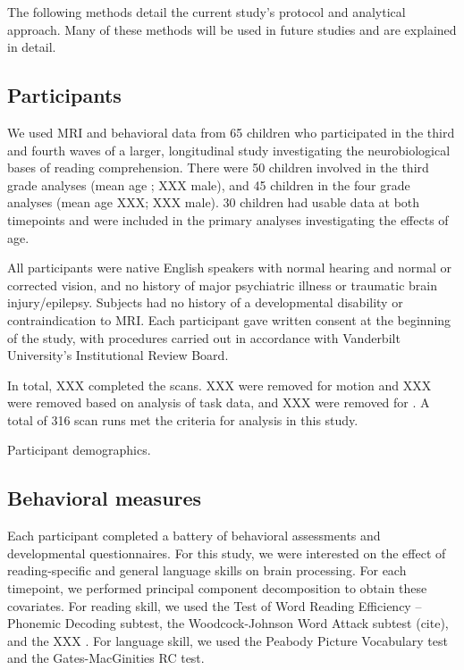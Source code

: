 The following methods detail the current study's protocol and analytical approach. Many of these methods will be used in future studies and are explained in detail. 

\subsection{Participants}

We used MRI and behavioral data from 65 children who participated in the third and fourth waves of a larger, longitudinal study investigating the neurobiological bases of reading comprehension. There were 50 children involved in the third grade analyses (mean age ; XXX male), and 45 children in the four grade analyses (mean age XXX; XXX male). 30 children had usable data at both timepoints and were included in the primary analyses investigating the effects of age.

All participants were native English speakers with normal hearing and normal or corrected vision, and no history of major psychiatric illness or traumatic brain injury/epilepsy. Subjects had no history of a developmental disability or contraindication to MRI.  Each participant gave written consent at the beginning of the study, with procedures carried out in accordance with Vanderbilt University’s Institutional Review Board.

In total, XXX completed the scans. XXX were removed for motion and XXX were removed based on analysis of task data, and XXX were removed for . A total of 316 scan runs met the criteria for analysis in this study.

\begin{table}
\scriptsize
\renewcommand{\tabcolsep}{0.09cm}
\centering

\caption{Participant demographics.}
\label{table:Ch2_Participants}
\end{table}

\subsection{Behavioral measures}
Each participant completed a battery of behavioral assessments and developmental questionnaires. For this study, we were interested on the effect of reading-specific and general language skills on brain processing. For each timepoint, we performed principal component decomposition to obtain these covariates. For reading skill, we used the Test of Word Reading Efficiency – Phonemic Decoding subtest, the Woodcock-Johnson Word Attack subtest (cite), and the XXX . For language skill, we used the Peabody Picture Vocabulary test and the Gates-MacGinities RC test. 

